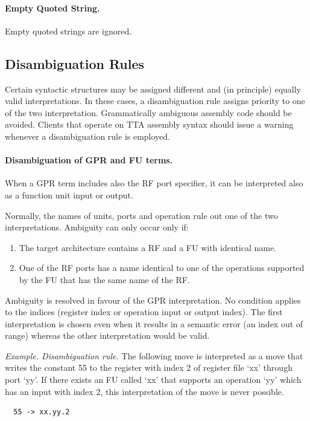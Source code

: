 \documentclass[twoside]{tceusermanual}
\begin{document}
\paragraph{Empty Quoted String.}
Empty quoted strings are ignored.

\subsection{Disambiguation Rules}

Certain syntactic structures may be assigned different and (in principle)
equally valid interpretations. In these cases, a disambiguation rule assigns
priority to one of the two interpretation.
%
Grammatically ambiguous assembly code should be avoided.  Clients that
operate on TTA assembly syntax should issue a warning whenever a
disambiguation rule is employed.

\paragraph{Disambiguation of GPR and FU terms.}
When a GPR term includes also the RF port specifier, it can be interpreted
also as a function unit input or output.

Normally, the names of units, ports and operation rule out one of the two
interpretations.  Ambiguity can only occur only if:
\begin{enumerate}
\item%
  The target architecture contains a RF and a FU with identical name.
\item%
  One of the RF ports has a name identical to one of the operations
  supported by the FU that has the same name of the RF.
%
\end{enumerate}

Ambiguity is resolved in favour of the GPR interpretation. No condition
applies to the indices (register index or operation input or output index).
The first interpretation is chosen even when it results in a semantic error
(an index out of range) whereas the other interpretation would be valid.

\emph{Example. Disambiguation rule.} The following move is interpreted as a
move that writes the constant 55 to the register with index 2 of
register file `xx' through port `yy'.  If there exists an FU called `xx'
that supports an operation `yy' which has an input with index 2, this
interpretation of the move is never possible.
\begin{verbatim}
  55 -> xx.yy.2
\end{verbatim}
\end{document}
